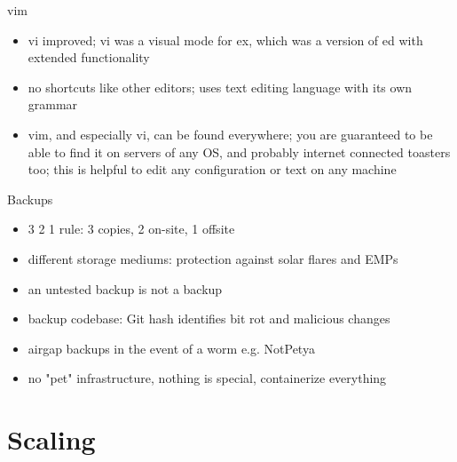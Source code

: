 \documentclass{beamer}
\begin{document}
\begin{frame}{vim}
  \begin{itemize}
    \item vi improved; vi was a visual mode for ex, which was a version of ed
      with extended functionality
    \item no shortcuts like other editors; uses text editing language with its
      own grammar
    \item vim, and especially vi, can be found everywhere; you are guaranteed
      to be able to find it on servers of any OS, and probably internet
      connected toasters too; this is helpful to edit any configuration or text
      on any machine
  \end{itemize}
\end{frame}

\begin{frame}{Backups}
  \begin{itemize}
    \item 3 2 1 rule: 3 copies, 2 on-site, 1 offsite
    \item different storage mediums: protection against solar flares and EMPs
    \item an untested backup is not a backup
    \item backup codebase: Git hash identifies bit rot and malicious
      changes
    \item airgap backups in the event of a worm e.g. NotPetya
    \item no "pet" infrastructure, nothing is special, containerize everything
  \end{itemize}
\end{frame}

\section{Scaling}
\end{document}
